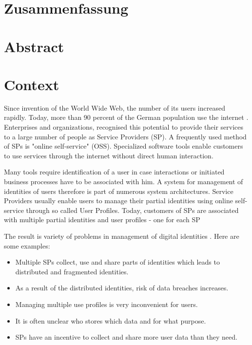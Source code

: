 \documentclass[
     12pt,         %
     a4paper,      %
     BCOR=10mm,version=first,     %
     DIV=14,version=first,        %
     ]{scrreprt}
\begin{document}
\chapter*{Zusammenfassung}

\newpage

\chapter*{Abstract}

\newpage

\tableofcontents
\cleardoublepage
{}

\chapter{Context}
Since invention of the World Wide Web, the number of its users increased rapidly. Today, more than 90 percent of the German population use the internet \cite{Onlinestudie}. Enterprises and organizations, recognised this potential to provide their services to a large number of people as Service Providers (SP). A frequently used method of SPs is "online self-service" (OSS). Specialized software tools enable customers to use services through the internet without direct human interaction.

Many tools require identification of a user in case interactions or initiated business processes have to be associated with him. A system for management of identities of users therefore is part of numerous system architectures. Service Providers usually enable users to manage their partial identities using online self-service through so called User Profiles. Today, customers of SPs are associated with multiple partial identities and user profiles - one for each SP

The result is variety of problems in management of digital identities \cite{IdentityCrisis}. Here are some examples:
\begin{itemize}
    \item Multiple SPs collect, use and share parts of identities which leads to distributed and fragmented identities.
    \item As a result of the distributed identities, risk of data breaches increases.
    \item Managing multiple use profiles is very inconvenient for users.
    \item It is often unclear who stores which data and for what purpose.
    \item SPs have an incentive to collect and share more user data than they need.
\end{itemize}
\end{document}
